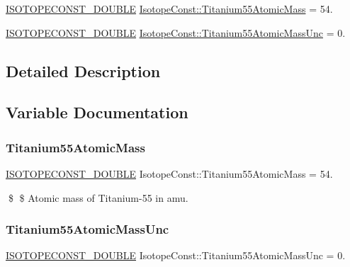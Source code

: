 \begin{DoxyCompactItemize}
\item 
\mbox{\hyperlink{group___isotope_const-_macros_ga8f45a7272ce02c0b4c65c44636ed719a}{I\+S\+O\+T\+O\+P\+E\+C\+O\+N\+S\+T\+\_\+\+D\+O\+U\+B\+LE}} \mbox{\hyperlink{group___isotope_const-_titanium-_ti55_ga4eb20bb94ed0b585745cfba7ddfa2df7}{Isotope\+Const\+::\+Titanium55\+Atomic\+Mass}} = 54.
\item 
\mbox{\hyperlink{group___isotope_const-_macros_ga8f45a7272ce02c0b4c65c44636ed719a}{I\+S\+O\+T\+O\+P\+E\+C\+O\+N\+S\+T\+\_\+\+D\+O\+U\+B\+LE}} \mbox{\hyperlink{group___isotope_const-_titanium-_ti55_ga8308b86e62e934176ad5f408aa5c6873}{Isotope\+Const\+::\+Titanium55\+Atomic\+Mass\+Unc}} = 0.
\end{DoxyCompactItemize}


\subsection{Detailed Description}


\subsection{Variable Documentation}
\mbox{\label{group___isotope_const-_titanium-_ti55_ga4eb20bb94ed0b585745cfba7ddfa2df7}} 
\subsubsection{\texorpdfstring{Titanium55\+Atomic\+Mass}{Titanium55AtomicMass}}
{\footnotesize\ttfamily \mbox{\hyperlink{group___isotope_const-_macros_ga8f45a7272ce02c0b4c65c44636ed719a}{I\+S\+O\+T\+O\+P\+E\+C\+O\+N\+S\+T\+\_\+\+D\+O\+U\+B\+LE}} Isotope\+Const\+::\+Titanium55\+Atomic\+Mass = 54.}

\$ \$ Atomic mass of Titanium-\/55 in amu. \mbox{\label{group___isotope_const-_titanium-_ti55_ga8308b86e62e934176ad5f408aa5c6873}} 
\subsubsection{\texorpdfstring{Titanium55\+Atomic\+Mass\+Unc}{Titanium55AtomicMassUnc}}
{\footnotesize\ttfamily \mbox{\hyperlink{group___isotope_const-_macros_ga8f45a7272ce02c0b4c65c44636ed719a}{I\+S\+O\+T\+O\+P\+E\+C\+O\+N\+S\+T\+\_\+\+D\+O\+U\+B\+LE}} Isotope\+Const\+::\+Titanium55\+Atomic\+Mass\+Unc = 0.}

